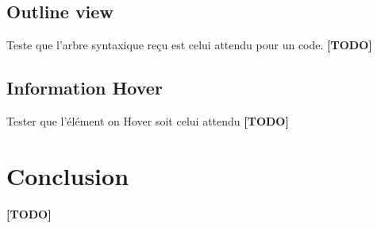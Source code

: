 \documentclass[
    iict, %
    il, %
]{heig-tb}
\begin{document}
\section{Outline view}
Teste que l'arbre syntaxique reçu est celui attendu pour un code.
\textbf{[TODO]}

\section{Information Hover}
Tester que l'élément on Hover soit celui attendu
\textbf{[TODO]}

\chapter{Conclusion}
\textbf{[TODO]}



\printbibliography
{}
\end{document}
